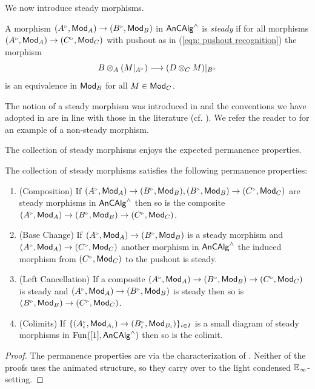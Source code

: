 We now introduce steady morphisms.
\begin{definition}\label{def: steady morphism}
    A morphism $(A^{\tri},\Mod_{A})\to(B^{\tri},\Mod_{B})$ in $\mathsf{An}\mathsf{CAlg}^{\wedge}$ is \emph{steady} if for all morphisms $(A^{\tri},\Mod_{A})\to(C^{\tri},\Mod_{C})$ with pushout as in (\ref{eqn: pushout recognition}) the morphism 
    $$B\otimes_{A}(M|_{A^{\tri}})\longrightarrow(D\otimes_{C}M)|_{B^{\tri}}$$
    is an equivalence in $\mathsf{Mod}_{B}$ for all $M\in\mathsf{Mod}_{C}$. 
\end{definition}
\begin{remark}\label{rmk: definition of steady maps}
    The notion of a steady morphism was introduced in \cite[Def. 12.13]{Analytic} and the conventions we have adopted in  are in line with those in the literature \cite[Def. 2.3.16 \& Rmk. 2.3.17]{MannRigid6FF} (cf. \cite[Def. 1.17 \& Rmk. 1.18]{MikamiFFDescent}). We refer the reader to \cite[p. 102]{Analytic} for an example of a non-steady morphism. 
\end{remark}
The collection of steady morphisms enjoys the expected permanence properties.
\begin{proposition}\label{prop: permanence properties of steady morphisms}
    The collection of steady morphisms satisfies the following permanence properties: 
    \begin{enumerate}
        \item (Composition) If $(A^{\tri},\Mod_{A})\to (B^{\tri},\Mod_{B}), (B^{\tri},\Mod_{B})\to (C^{\tri},\Mod_{C})$ are steady morphisms in $\mathsf{An}\mathsf{CAlg}^{\wedge}$ then so is the composite $(A^{\tri},\Mod_{A})\to (B^{\tri},\Mod_{B})\to (C^{\tri},\Mod_{C})$. 
        \item (Base Change) If $(A^{\tri},\Mod_{A})\to (B^{\tri},\Mod_{B})$ is a steady morphism and $(A^{\tri},\Mod_{A})\to (C^{\tri},\Mod_{C})$ another morphism in $\mathsf{An}\mathsf{CAlg}^{\wedge}$ the induced morphism from $(C^{\tri},\Mod_{C})$ to the pushout is steady. 
        \item (Left Cancellation) If a composite $(A^{\tri},\Mod_{A})\to (B^{\tri},\Mod_{B})\to (C^{\tri},\Mod_{C})$ is steady and $(A^{\tri},\Mod_{A})\to (B^{\tri},\Mod_{B})$ is steady then so is $(B^{\tri},\Mod_{B})\to (C^{\tri},\Mod_{C})$. 
        \item (Colimits) If $\{(A_{i}^{\tri},\Mod_{A_{i}})\to (B_{i}^{\tri},\Mod_{B_{i}})\}_{i\in I}$ is a small diagram of steady morphisms in $\mathrm{Fun}([1],\mathsf{An}\mathsf{CAlg}^{\wedge})$ then so is the colimit. 
    \end{enumerate}
\end{proposition}
\begin{proof}
    The permanence properties are \cite[Prop. 2.3.19]{MannRigid6FF} via the characterization of \cite[Prop. 2.3.18]{MannRigid6FF}. Neither of the proofs uses the animated structure, so they carry over to the light condensed $\mathbb{E}_{\infty}$-setting.
\end{proof}
